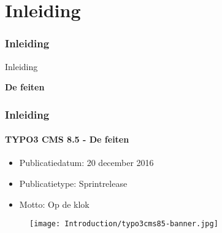 %

\section{Inleiding}
\begin{frame}[fragile]
	\frametitle{Inleiding}

	\begin{center}\huge{Inleiding}\end{center}
	\begin{center}\huge{\color{typo3darkgrey}\textbf{De feiten}}\end{center}

\end{frame}

\begin{frame}[fragile]
	\frametitle{Inleiding}
	\framesubtitle{TYPO3 CMS 8.5 - De feiten}

	\begin{itemize}
		\item Publicatiedatum: 20 december 2016
		\item Publicatietype: Sprintrelease
		\item Motto: Op de klok
	\end{itemize}

	\begin{figure}
		\texttt{[image: Introduction/typo3cms85-banner.jpg]}
	\end{figure}

\end{frame}

